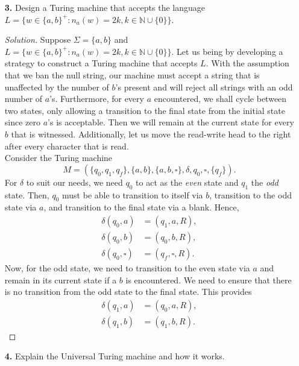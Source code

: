 \documentclass[ 12pt ]{article}
\begin{document}
\begin{enumerate}
	\item[\textbf{3.}] Design a Turing machine that accepts the language $L = \{ w \in \{ a, b \}^+ : n_a(w) = 2k, k \in \mathbb{N} \cup \{ 0 \} \}$.

		\begin{proof}[Solution]
			Suppose $\Sigma = \{ a, b \}$ and $L = \{ w \in \{ a, b \}^+ : n_a(w) = 2k, k \in \mathbb{N} \cup \{ 0 \} \}$. Let us being by developing a strategy to construct a Turing
			machine that accepts $L$. With the assumption that we ban the null string, our machine must accept a string that is unaffected by the number of $b$'s present and will
			reject all strings with an odd number of $a$'s. Furthermore, for every $a$ encountered, we shall cycle between two states, only allowing a transition to the final state
			from the initial state since zero $a$'s is acceptable. Then we will remain at the current state for every $b$ that is witnessed. Additionally, let us move the read-write
			head to the right after every character that is read. \\

			Consider the Turing machine $$M = (\{ q_0, q_1, q_f \}, \{ a, b \}, \{ a, b, \square \}, \delta, q_0, \square, \{ q_f \}).$$ For $\delta$ to suit our needs, we need $q_0$
			to act as the \textit{even} state and $q_1$ the \textit{odd} state. Then, $q_0$ must be able to transition to itself via $b$, transition to the odd state via $a$, and
			transition to the final state via a blank. Hence,
			\begin{align*}
				\delta( q_0, a ) &= ( q_1, a, R ), \\
				\delta( q_0, b ) &= ( q_0, b, R ), \\
				\delta( q_0, \square ) &= ( q_f, \square, R ).
			\end{align*}
			Now, for the odd state, we need to transition to the even state via $a$ and remain in its current state if a $b$ is encountered. We need to ensure that there is no
			transition from the odd state to the final state. This provides
			\begin{align*}
				\delta( q_1, a ) &= ( q_0, a, R ), \\
				\delta( q_1, b ) &= ( q_1, b, R ).
			\end{align*}

		\end{proof}


	\item[\textbf{4.}] Explain the Universal Turing machine and how it works.


\end{enumerate}
\end{document}
